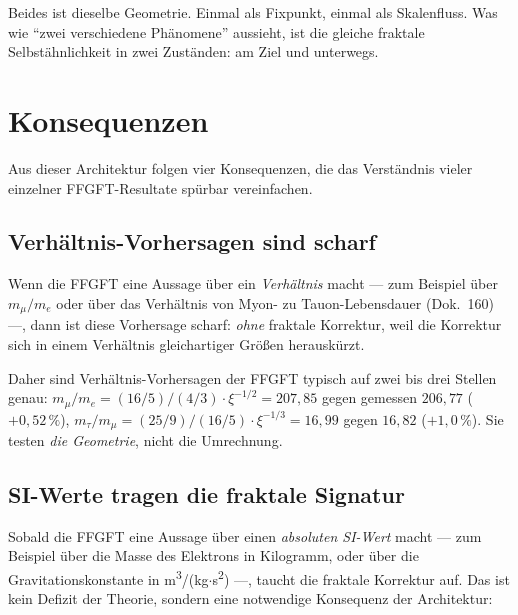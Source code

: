\noindent
Beides ist dieselbe Geometrie. Einmal als Fixpunkt, einmal als
Skalenfluss. Was wie ``zwei verschiedene Phänomene'' aussieht, ist die
gleiche fraktale Selbstähnlichkeit in zwei Zuständen: am Ziel und
unterwegs.

\section{Konsequenzen}

Aus dieser Architektur folgen vier Konsequenzen, die das Verständnis vieler
einzelner FFGFT-Resultate spürbar vereinfachen.

\subsection{Verhältnis-Vorhersagen sind scharf}

Wenn die FFGFT eine Aussage über ein \emph{Verhältnis} macht --- zum
Beispiel über $m_{\mu}/m_{e}$ oder über das Verhältnis von Myon- zu
Tauon-Lebensdauer (Dok.~160) ---, dann ist diese Vorhersage scharf:
\emph{ohne} fraktale Korrektur, weil die Korrektur sich in einem Verhältnis
gleichartiger Größen herauskürzt.

\begin{center}
\end{center}

Daher sind Verhältnis-Vorhersagen der FFGFT typisch auf zwei bis drei
Stellen genau: $m_\mu/m_e = (16/5)/(4/3)\cdot\xi^{-1/2} = 207{,}85$ gegen
gemessen $206{,}77$ ($+0{,}52\,\%$), $m_\tau/m_\mu =
(25/9)/(16/5)\cdot\xi^{-1/3} = 16{,}99$ gegen $16{,}82$ ($+1{,}0\,\%$).
Sie testen \emph{die Geometrie}, nicht die Umrechnung.

\subsection{SI-Werte tragen die fraktale Signatur}

Sobald die FFGFT eine Aussage über einen \emph{absoluten SI-Wert} macht ---
zum Beispiel über die Masse des Elektrons in Kilogramm, oder über die
Gravitationskonstante in m\textsuperscript{3}/(kg$\cdot$s\textsuperscript{2})
---, taucht die fraktale Korrektur auf. Das ist kein Defizit der Theorie,
sondern eine notwendige Konsequenz der Architektur:

